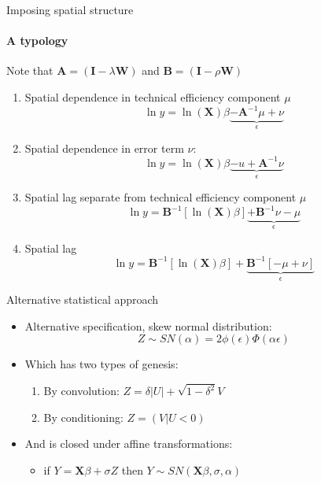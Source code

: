 \documentclass[presentation]{beamer}
\begin{document}
\begin{frame}{Imposing spatial structure}
\framesubtitle{A typology}
Note that $\mathbf{A} = \left(\mathbf{I} - \lambda\mathbf{W}\right)$ and $\mathbf{B} = \left(\mathbf{I} - \rho\mathbf{W}\right)$
	\begin{enumerate}
		\item Spatial dependence in technical efficiency component $\mu$
		\begin{equation*}					
			\ln y = \ln(\mathbf{X}) \beta \underbrace{- \mathbf{A}^{-1}\mu + \nu}_\epsilon
		\end{equation*}
		\item Spatial dependence in error term $\nu$:
		\begin{equation*}					
			\ln y = \ln(\mathbf{X}) \beta \underbrace{- u +  \mathbf{A}^{-1}\nu}_\epsilon
		\end{equation*}
		\item Spatial lag separate from technical efficiency component $\mu$
		\begin{equation*}					
			\ln y =  \mathbf{B}^{-1}\left[\ln(\mathbf{X}) \beta\right] \underbrace{+ \mathbf{B}^{-1}\nu - \mu}_{\epsilon}
		\end{equation*}
		\item Spatial lag
		\begin{equation*}					
			\ln y = \mathbf{B}^{-1}\left[\ln(\mathbf{X}) \beta \right]+  \underbrace{\mathbf{B}^{-1}\left[- \mu + \nu\right]}_\epsilon
		\end{equation*}
	\end{enumerate}
\end{frame}

\begin{frame}{Alternative statistical approach}
	\begin{itemize}
		\item Alternative specification, skew normal distribution:
		\begin{equation*}
		Z \sim SN(\alpha) = 2\phi(\epsilon)\Phi(\alpha \epsilon)
		\end{equation*}
		\pause
		\item Which has two types of genesis:
		\begin{enumerate}
			\item By convolution: $Z = \delta|U| + \sqrt{1-\delta^2}V$
			\item By conditioning: $Z = (V|U<0)$
			\newline
		\end{enumerate}
		\pause
		\item And is closed under affine transformations: 
		\begin{itemize}
			\item if $Y = \mathbf{X}\beta + \sigma Z$ then $Y \sim SN(\mathbf{X}\beta,\sigma, \alpha)$
		\end{itemize}
	\end{itemize}
\end{frame}
\end{document}
